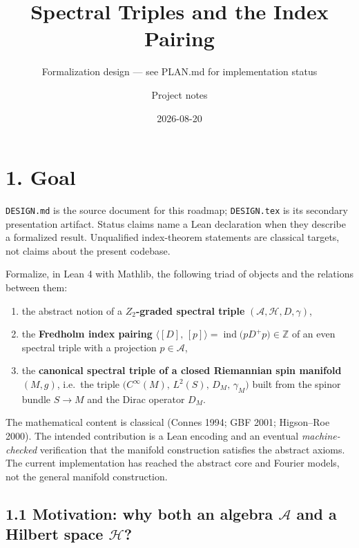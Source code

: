 \documentclass[
  11pt,
]{article}
\title{Spectral Triples and the Index Pairing}
\subtitle{Formalization design --- see PLAN.md for implementation status}
\author{Project notes}
\date{2026-08-20}
\providecommand{\tightlist}{%
  \setlength{\itemsep}{0pt}\setlength{\parskip}{0pt}}
\begin{document}
\maketitle

\section{1. Goal}\label{goal}

\texttt{DESIGN.md} is the source document for this roadmap;
\texttt{DESIGN.tex} is its secondary presentation artifact. Status claims
name a Lean declaration when they describe a formalized result. Unqualified
index-theorem statements are classical targets, not claims about the present
codebase.

Formalize, in Lean 4 with Mathlib, the following triad of objects and
the relations between them:

\begin{enumerate}
\def\labelenumi{(\alph{enumi})}
\tightlist
\item
  the abstract notion of a \textbf{\(Z_2\)-graded spectral triple}
  \((\mathcal{A}, \mathcal{H}, D, \gamma)\),
\item
  the \textbf{Fredholm index pairing}
  \(\bigl\langle [D],\,[p]\bigr\rangle = \mathop{\mathrm{ind}}\bigl(p D^+ p\bigr) \in \mathbb{Z}\)
  of an even spectral triple with a projection \(p \in \mathcal{A}\),
\item
  the \textbf{canonical spectral triple of a closed Riemannian spin
  manifold} \((M, g)\), i.e.~the triple
  \(\bigl(C^{\infty}(M),\, L^2(S),\, D_M,\, \gamma_M\bigr)\) built from
  the spinor bundle \(S \to M\) and the Dirac operator \(D_M\).
\end{enumerate}

The mathematical content is classical (Connes 1994; GBF 2001;
Higson--Roe 2000). The intended contribution is a Lean encoding and an
eventual \emph{machine-checked} verification that the manifold
construction satisfies the abstract axioms. The current implementation
has reached the abstract core and Fourier models, not the general
manifold construction.

\subsection{\texorpdfstring{1.1 Motivation: why both an algebra
\(\mathcal{A}\) and a Hilbert space
\(\mathcal{H}\)?}{1.1 Motivation: why both an algebra \textbackslash mathcal\{A\} and a Hilbert space \textbackslash mathcal\{H\}?}}\label{motivation-why-both-an-algebra-mathcala-and-a-hilbert-space-mathcalh}
\end{document}
